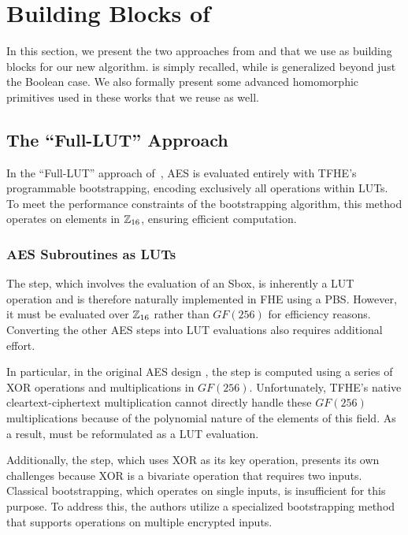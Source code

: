 \section{Building Blocks of \hippo}
\label{sec:previous-blocks}


In this section, we present the two approaches from \cite{DBLP:conf/wahc/TramaCBS23} and \cite{TCHES:BonPoiRiv24} that we use as building blocks for our new algorithm.  \cite{DBLP:conf/wahc/TramaCBS23} is simply recalled, while \cite{TCHES:BonPoiRiv24} is generalized beyond just the Boolean case. We also formally present some advanced homomorphic primitives used in these works that we reuse as well.

\subsection{The ``Full-LUT'' Approach}

In the ``Full-LUT'' approach of~\cite{DBLP:conf/wahc/TramaCBS23}, AES is evaluated entirely with TFHE's programmable bootstrapping, encoding exclusively all operations within LUTs. To meet the performance constraints of the bootstrapping algorithm, this method operates on elements in $\mathbb{Z}_{16}$, ensuring efficient computation.

\subsubsection{AES Subroutines as LUTs}

The \SubBytes step, which involves the evaluation of an Sbox, is inherently a LUT operation and is therefore naturally implemented in FHE using a PBS. However, it must be evaluated over $\mathbb{Z}_{16}$ rather than $GF(256)$ for efficiency reasons. Converting the other AES steps into LUT evaluations also requires additional effort.

In particular, in the original AES design \cite{aes-original}, the \MixColumns step is computed using a series of XOR operations and multiplications in $GF(256)$. Unfortunately, TFHE’s native cleartext-ciphertext multiplication cannot directly handle these $GF(256)$ multiplications because of the polynomial nature of the elements of this field. As a result, \MixColumns must be reformulated as a LUT evaluation.

Additionally, the \AddRoundKey step, which uses XOR as its key operation, presents its own challenges because XOR is a bivariate operation that requires two inputs. Classical bootstrapping, which operates on single inputs, is insufficient for this purpose. To address this, the authors utilize a specialized bootstrapping method that supports operations on multiple encrypted inputs.

